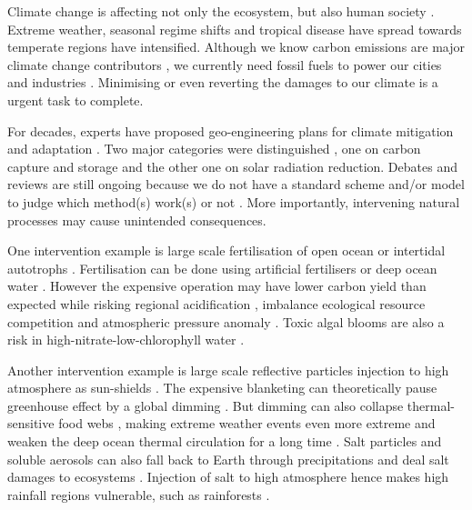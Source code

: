\documentclass[../thesis.tex]{subfiles} %
\begin{document}
Climate change is affecting not only the ecosystem, but also human society \autocite{notz2016observed,schuur2015climate}.  Extreme weather, seasonal regime shifts and tropical disease have spread towards temperate regions have intensified.  Although we know carbon emissions are major climate change contributors \autocite{notz2016observed}, we currently need fossil fuels to power our cities and industries \autocite{ferguson2000electricity}.  Minimising or even reverting the damages to our climate is a urgent task to complete.

For decades, experts have proposed geo-engineering plans for climate mitigation and adaptation \autocite{farrelly2013carbon,yang2008progress,boyd2008ranking,boettcher2019high,vaughan2011review}.  Two major categories were distinguished \autocite{boyd2008ranking}, one on carbon capture and storage and the other one on solar radiation reduction.  Debates and reviews are still ongoing because we do not have a standard scheme and/or model to judge which method(s) work(s) or not \autocite{boyd2008ranking,boettcher2019high,boyd2016development,oschlies2017indicators,gattuso2018ocean}.  More importantly, intervening natural processes may cause unintended consequences.

One intervention example is large scale fertilisation of open ocean \autocite{gnanadesikan2008export,lovelock2007ocean,lawrence2014efficiency} or intertidal autotrophs \autocite{duarte2017can,johannessen2016geoengineering,krause2016substantial}.  Fertilisation can be done using artificial fertilisers \autocite{gnanadesikan2008export,lawrence2014efficiency,trick2010iron} or deep ocean water \autocite{kwiatkowski2015atmospheric,lovelock2007ocean}.  However the expensive operation may have lower carbon yield than expected \autocite{boyd2008implications,gnanadesikan2008export,oschlies2010side} while risking regional acidification \autocite{oschlies2010side}, imbalance ecological resource competition \autocite{chung2011using,thiele2012microbial,batten2014did} and atmospheric pressure anomaly \autocite{kwiatkowski2015atmospheric}.  Toxic algal blooms are also a risk in high-nitrate-low-chlorophyll water \autocite{trick2010iron}.

Another intervention example is large scale reflective particles injection to high atmosphere as sun-shields \autocite{latham2008global,stjern2018response,xia2016stratospheric}.  The expensive blanketing \autocite{boyd2008implications} can theoretically pause greenhouse effect by a global dimming \autocite{williamson2012impacts}.  But dimming can also collapse thermal-sensitive food webs \autocite{williamson2012impacts}, making extreme weather events even more extreme \autocite{jones2009climate} and weaken the deep ocean thermal circulation for a long time \autocite{lauvset2017climate,williamson2012impacts}.  Salt particles and soluble aerosols can also fall back to Earth through precipitations and deal salt damages to ecosystems \autocite{bala2011albedo}.  Injection of salt to high atmosphere hence makes high rainfall regions vulnerable, such as rainforests \autocite{muri2015tropical}.
\end{document}
